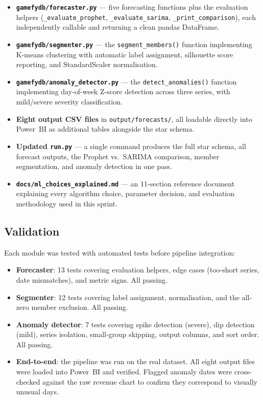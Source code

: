 \begin{itemize}
  \item \textbf{\texttt{gamefydb/forecaster.py}} --- five forecasting functions plus
        the evaluation helpers (\texttt{\_evaluate\_prophet},
        \texttt{\_evaluate\_sarima}, \texttt{\_print\_comparison}), each independently
        callable and returning a clean pandas DataFrame.
  \item \textbf{\texttt{gamefydb/segmenter.py}} --- the \texttt{segment\_members()}
        function implementing K-means clustering with automatic label assignment,
        silhouette score reporting, and StandardScaler normalisation.
  \item \textbf{\texttt{gamefydb/anomaly\_detector.py}} --- the
        \texttt{detect\_anomalies()} function implementing day-of-week Z-score
        detection across three series, with mild/severe severity classification.
  \item \textbf{Eight output CSV files} in \texttt{output/forecasts/}, all loadable
        directly into Power~BI as additional tables alongside the star schema.
  \item \textbf{Updated \texttt{run.py}} --- a single command produces the full star
        schema, all forecast outputs, the Prophet vs.\ SARIMA comparison, member
        segmentation, and anomaly detection in one pass.
  \item \textbf{\texttt{docs/ml\_choices\_explained.md}} --- an 11-section reference
        document explaining every algorithm choice, parameter decision, and evaluation
        methodology used in this sprint.
\end{itemize}

\subsection{Validation}

Each module was tested with automated tests before pipeline integration:

\begin{itemize}[noitemsep]
  \item \textbf{Forecaster}: 13 tests covering evaluation helpers, edge cases
        (too-short series, date mismatches), and metric signs. All passing.
  \item \textbf{Segmenter}: 12 tests covering label assignment, normalisation, and
        the all-zero member exclusion. All passing.
  \item \textbf{Anomaly detector}: 7 tests covering spike detection (severe), dip
        detection (mild), series isolation, small-group skipping, output columns, and
        sort order. All passing.
  \item \textbf{End-to-end}: the pipeline was run on the real dataset. All eight
        output files were loaded into Power~BI and verified. Flagged anomaly dates
        were cross-checked against the raw revenue chart to confirm they correspond
        to visually unusual days.
\end{itemize}

